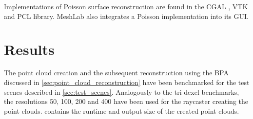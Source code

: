 \begin{description}
	Implementations of Poisson surface reconstruction are found in \eg the CGAL \cite{cgal_poisson}, VTK \cite{vtk_poisson} and PCL \cite{pcl} library.
	MeshLab also integrates a Poisson implementation into its GUI.
\end{description}


\section{Results}
\label{sec:point_cloud_results}

The point cloud creation and the subsequent reconstruction using the BPA discussed in \cref{sec:point_cloud_reconstruction} have been benchmarked for the test scenes described in \cref{sec:test_scenes}.
Analogously to the tri-dexel benchmarks, the resolutions 50, 100, 200 and 400 have been used for the raycaster creating the point clouds.
 contains the runtime and output size of the created point clouds.
%
